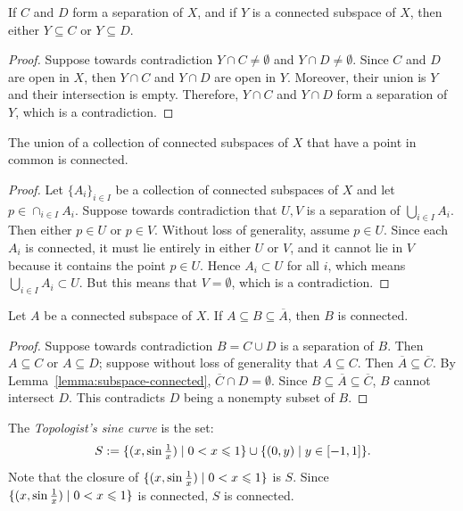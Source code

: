 \begin{lemma}\label{lemma:connected-subspace-inclusion}
    If $C$ and $D$ form a separation of $X$, and if $Y$ is a connected subspace of $X$, then either $Y \subseteq C$ or $Y \subseteq D$. 
\end{lemma}
    \begin{proof}
        Suppose towards contradiction $Y \cap C \neq \emptyset$ and $Y \cap D \neq \emptyset$. Since $C$ and $D$ are open in $X$, then $Y \cap C$ and $Y \cap D$ are open in $Y$. Moreover, their union is $Y$ and their intersection is empty. Therefore, $Y \cap C$ and $Y \cap D$ form a separation of $Y$, which is a contradiction.
    \end{proof}

\begin{theorem}\label{thm:connected-if-shared-points}
    The union of a collection of connected subspaces of $X$ that have a point in common is connected.
\end{theorem}
    \begin{proof}
        Let $\{A_i\}_{i \in I}$ be a collection of connected subspaces of $X$ and let $p \in \cap_{i \in I}A_i$. Suppose towards contradiction that $U,V$ is a separation of $\bigcup_{i \in I}A_i$. Then either $p \in U$ or $p \in V$. Without loss of generality, assume $p \in U$. Since each $A_i$ is connected, it must lie entirely in either $U$ or $V$, and it cannot lie in $V$ because it contains the point $p \in U$. Hence $A_i \subset U$ for all $i$, which means $\bigcup_{i \in I}A_i \subset U$. But this means that $V = \emptyset$, which is a contradiction.
    \end{proof}

\begin{theorem}
    Let $A$ be a connected subspace of $X$. If $A \subseteq B \subseteq \overline{A}$, then $B$ is connected.
\end{theorem}
    \begin{proof}
        Suppose towards contradiction $B = C \cup D$ is a separation of $B$. Then $A \subseteq C$ or $A \subseteq D$; suppose without loss of generality that $A \subseteq C$. Then $\overline{A} \subseteq \overline{C}$. By Lemma~\ref{lemma:subspace-connected}, $\overline{C} \cap D = \emptyset$. Since $B \subseteq \overline{A} \subseteq \overline{C}$, $B$ cannot intersect $D$. This contradicts $D$ being a nonempty subset of $B$.
    \end{proof}

\begin{example}
    The \textit{Topologist's sine curve} is the set:
        \begin{equation*}
        \begin{split}
            S := \{(x,\sin {\textstyle\frac{1}{x}}) \mid 0 < x \leqslant 1\} \cup \{(0,y) \mid y \in [-1,1]\}.
        \end{split}
        \end{equation*}
    Note that the closure of $\{(x,\sin {\textstyle\frac{1}{x}}) \mid 0 < x \leqslant 1\}$ is $S$. Since $\{(x,\sin {\textstyle\frac{1}{x}}) \mid 0 < x \leqslant 1\}$ is connected, $S$ is connected.
\end{example}

